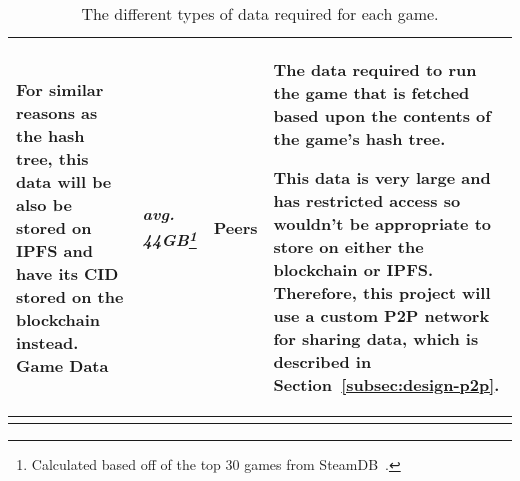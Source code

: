 \begin{longtable}{ p{} p{} p{} p{} }
  \vspace{1mm}
  \small For similar reasons as the hash tree, this data will be also be stored on IPFS and have its CID stored on the blockchain instead.
  \x
  Game Data
  & \textit{avg. 44GB\footnote{Calculated based off of the top 30 games from SteamDB~\cite{noauthor_steam_nodate}.}}
  & Peers
  & The data required to run the game that is fetched based upon the contents of the game's hash tree.

  \vspace{1mm}
  \small This data is very large and has restricted access so wouldn't be appropriate to store on either the blockchain or IPFS. Therefore, this project will use a custom P2P network for sharing data, which is described in Section~\ref{subsec:design-p2p}.
  \\\bottomrule\bottomrule
  \caption{The different types of data required for each game.}
  \label{tab:data}
\end{longtable}